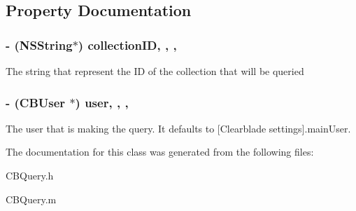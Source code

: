 \subsection{Property Documentation}
\hypertarget{interface_c_b_query_ad7e594dc30699c9dbae407e55b588b00}{
\subsubsection[{collection\+I\+D}]{\setlength{\rightskip}{0pt plus 5cm}-\/ (N\+S\+String$\ast$) collection\+I\+D\hspace{0.3cm}{\ttfamily [read]}, {\ttfamily [write]}, {\ttfamily [nonatomic]}, {\ttfamily [strong]}}}\label{interface_c_b_query_ad7e594dc30699c9dbae407e55b588b00}
The string that represent the I\+D of the collection that will be queried \hypertarget{interface_c_b_query_af5679b48acc1313cab6dd83e2777b440}{
\subsubsection[{user}]{\setlength{\rightskip}{0pt plus 5cm}-\/ ({\bf C\+B\+User} $\ast$) user\hspace{0.3cm}{\ttfamily [read]}, {\ttfamily [write]}, {\ttfamily [nonatomic]}, {\ttfamily [strong]}}}\label{interface_c_b_query_af5679b48acc1313cab6dd83e2777b440}
The user that is making the query. It defaults to \mbox{[}Clearblade settings\mbox{]}.main\+User. 

The documentation for this class was generated from the following files\+:\begin{DoxyCompactItemize}
\item 
C\+B\+Query.\+h\item 
C\+B\+Query.\+m\end{DoxyCompactItemize}
